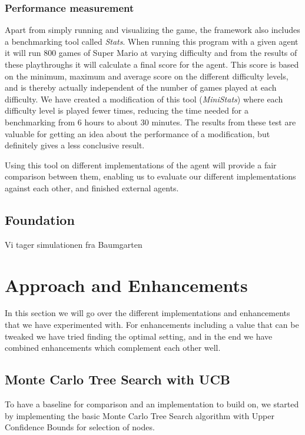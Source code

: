 \documentclass[10pt,a4paper]{article}
\begin{document}
\subsubsection{Performance measurement}
\label{benchmark}
Apart from simply running and visualizing the game, the framework also includes a benchmarking tool called \emph{Stats}. When running this program with a given agent it will run 800 games of Super Mario at varying difficulty and from the results of these playthroughs it will calculate a final score for the agent. This score is based on the minimum, maximum and average score on the different difficulty levels, and is thereby actually independent of the number of games played at each difficulty. We have created a modification of this tool (\emph{MiniStats}) where each difficulty level is played fewer times, reducing the time needed for a benchmarking from 6 hours to about 30 minutes. The results from these test are valuable for getting an idea about the performance of a modification, but definitely gives a less conclusive result.

Using this tool on different implementations of the agent will provide a fair comparison between them, enabling us to evaluate our different implementations against each other, and finished external agents.

\subsection{Foundation}
Vi tager simulationen fra Baumgarten

\clearpage

\section{Approach and Enhancements}
In this section we will go over the different implementations and enhancements that we have experimented with. For enhancements including a value that can be tweaked we have tried finding the optimal setting, and in the end we have combined enhancements which complement each other well.

\subsection{Monte Carlo Tree Search with UCB}
To have a baseline for comparison and an implementation to build on, we started by implementing the basic Monte Carlo Tree Search algorithm with Upper Confidence Bounds for selection of nodes.
\end{document}
